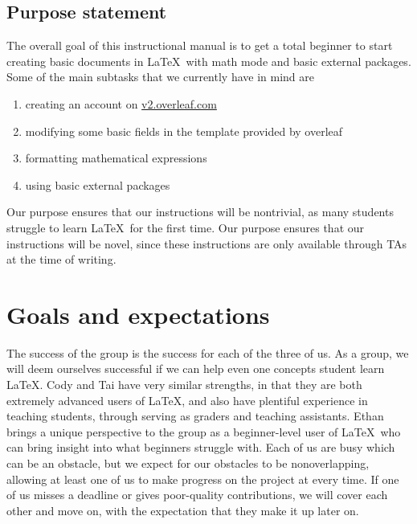 \documentclass{article}
\begin{document}
\subsection{Purpose statement}
The overall goal of this instructional manual is to get a total beginner to start creating basic documents in \LaTeX\ with math mode and basic external packages. Some of the main subtasks that we currently have in mind are
\begin{enumerate}
  \item creating an account on \url{v2.overleaf.com}
  \item modifying some basic fields in the template provided by overleaf
  \item formatting mathematical expressions
  \item using basic external packages
\end{enumerate}
Our purpose ensures that our instructions will be nontrivial, as many students struggle to learn \LaTeX\ for the first time. Our purpose ensures that our instructions will be novel, since these instructions are only available through TAs at the time of writing.

\section{Goals and expectations}
The success of the group is the success for each of the three of us. As a group, we will deem ourselves successful if we can help even one concepts student learn \LaTeX. Cody and Tai have very similar strengths, in that they are both extremely advanced users of \LaTeX, and also have plentiful experience in teaching students, through serving as graders and teaching assistants. Ethan brings a unique perspective to the group as a beginner-level user of \LaTeX\ who can bring insight into what beginners struggle with. Each of us are busy which can be an obstacle, but we expect for our obstacles to be nonoverlapping, allowing at least one of us to make progress on the project at every time. If one of us misses a deadline or gives poor-quality contributions, we will cover each other and move on, with the expectation that they make it up later on.
\end{document}
